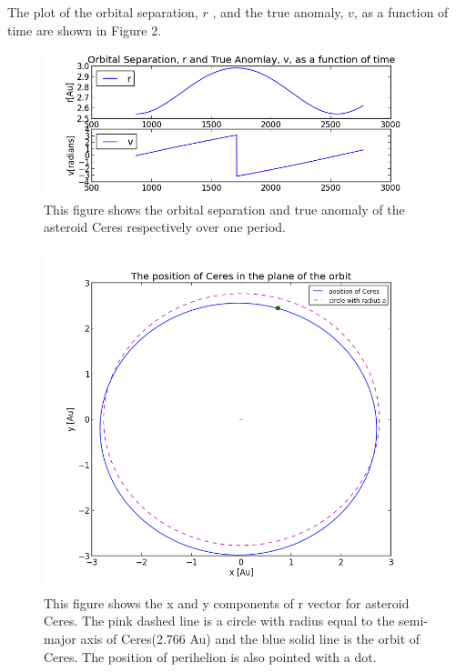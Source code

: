 \documentclass[letterpaper,12pt]{article}
\begin{document}
The plot of the orbital separation, \begin{math} r \end{math} , and the true anomaly, \begin{math} v \end{math}, as a function of time are shown in Figure 2.
\FloatBarrier
\begin{figure}[h!]
\centering
\includegraphics[scale=0.4]{figure4.png}
\caption{This figure shows the orbital separation and true anomaly of the asteroid Ceres respectively over one period.}
\end{figure}
\FloatBarrier



\FloatBarrier
\begin{figure}[h!]
\centering
\includegraphics[scale=0.4]{figure5.png}
\caption{This figure shows the x and y components of r vector for asteroid Ceres. The pink dashed line is a circle with radius equal to the semi-major axis of Ceres(2.766 Au) and the blue solid line is the orbit of Ceres. The position of perihelion is also pointed with a dot.}
\end{figure}
\FloatBarrier
\end{document}
